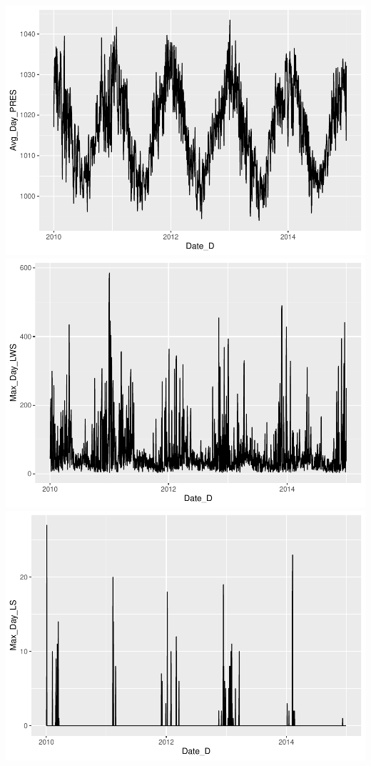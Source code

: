\documentclass[
]{article}
\begin{document}
\includegraphics{Final_Project_1_files/figure-latex/unnamed-chunk-2-5.pdf}
\includegraphics{Final_Project_1_files/figure-latex/unnamed-chunk-2-6.pdf}
\includegraphics{Final_Project_1_files/figure-latex/unnamed-chunk-2-7.pdf}
\end{document}
